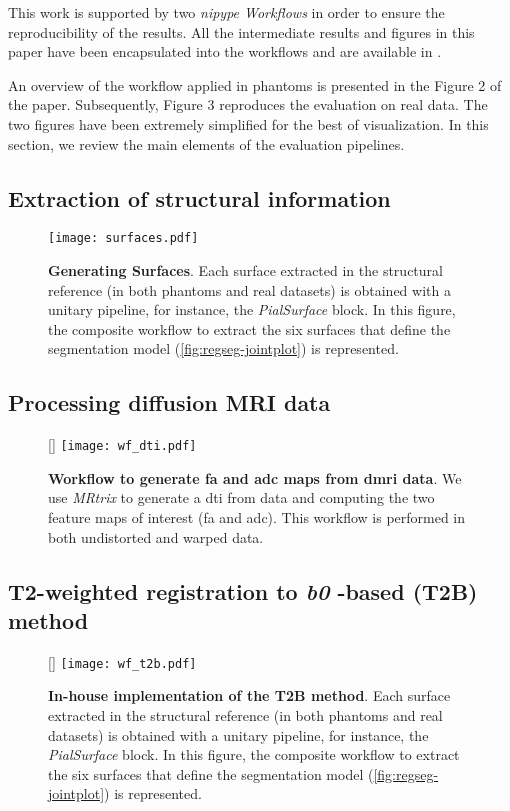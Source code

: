 \documentclass[a4paper]{report}
\begin{document}
This work is supported by two \emph{nipype Workflows} in order to ensure the reproducibility
  of the results.
All the intermediate results and figures in this paper have been encapsulated into
  the workflows and are available in \citep{esteban_acweregistration_2015}.

An overview of the workflow applied in phantoms is presented in the Figure 2 of the paper.
Subsequently, Figure 3 reproduces the evaluation on real data.
The two figures have been extremely simplified for the best of visualization.
In this section, we review the main elements of the evaluation pipelines.

\subsection{Extraction of structural information}
\begin{figure}[!ht]
  \texttt{[image: surfaces.pdf]}
  \caption{\textbf{Generating Surfaces}.
  Each surface extracted in the structural reference
    (in both phantoms and real datasets) is obtained with a unitary pipeline,
    for instance, the \emph{PialSurface} block.
  In this figure, the composite workflow to extract the six surfaces that define the
    segmentation model (\autoref{fig:regseg-jointplot}) is represented.
  }\label{fig:regseg-wf_surfaces}
\end{figure}

\subsection{Processing diffusion MRI data}
\begin{figure}[!ht]
  [\FBwidth]
  {\texttt{[image: wf\_dti.pdf]}}
  {\caption{\textbf{Workflow to generate \gls*{fa} and \gls*{adc} maps from \gls*{dmri} data}.
    We use \emph{MRtrix} \citep{tournier_mrtrix_2012} to generate a \gls*{dti} from data and
      computing the two feature maps of interest (\gls*{fa} and \gls*{adc}).
    This workflow is performed in both undistorted and warped data.}\label{fig:regseg-wf_dti}}
\end{figure}

\subsection{T2-weighted registration to \emph{b0} -based (T2B) method}
\begin{figure}[!ht]
  [\FBwidth]
  {\texttt{[image: wf\_t2b.pdf]}}
  {\caption{\textbf{In-house implementation of the T2B method}.
    Each surface extracted in the structural reference
      (in both phantoms and real datasets) is obtained with a unitary pipeline,
      for instance, the \emph{PialSurface} block.
    In this figure, the composite workflow to extract the six surfaces that define the
      segmentation model (\autoref{fig:regseg-jointplot}) is represented.}\label{fig:regseg-wf_t2b}}
\end{figure}
\end{document}
